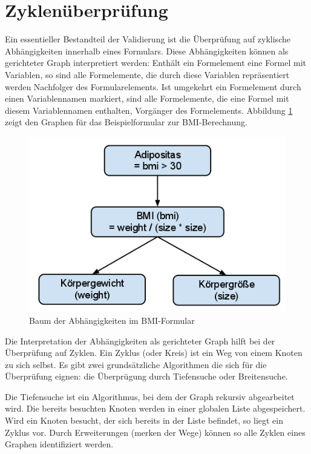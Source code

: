 \section{Zyklenüberprüfung}
\label{implementierung_zyklenueberpruefung}

Ein essentieller Bestandteil der Validierung ist die Überprüfung auf zyklische Abhängigkeiten innerhalb eines Formulars. Diese Abhängigkeiten können als gerichteter Graph interpretiert werden: Enthält ein Formelement eine Formel mit Variablen, so sind alle Formelemente, die durch diese Variablen repräsentiert werden Nachfolger des Formularelements. Ist umgekehrt ein Formelement durch einen Variablennamen markiert, sind alle Formelemente, die eine Formel mit diesem Variablennamen enthalten, Vorgänger des Formelements. Abbildung \ref{abb_cycle_bmi_tree} zeigt den Graphen für das Beispielformular zur BMI-Berechnung.

\begin{figure}[ht]
\includegraphics[scale=0.5]{figures/cycle_bmi_tree}
\caption{Baum der Abhängigkeiten im BMI-Formular}
\label{abb_cycle_bmi_tree}
\end{figure}

Die Interpretation der Abhängigkeiten als gerichteter Graph hilft bei der Überprüfung auf Zyklen. Ein Zyklus (oder Kreis) ist ein Weg von einem Knoten zu sich selbst\cite{Schl08}. Es gibt zwei grundsätzliche Algorithmen die sich für die Überprüfung eignen: die Überprügung durch Tiefensuche oder Breitensuche.

Die Tiefensuche ist ein Algorithmus, bei dem der Graph rekursiv abgearbeitet wird. Die bereits besuchten Knoten werden in einer globalen Liste abgespeichert. Wird ein Knoten besucht, der sich bereits in der Liste befindet, so liegt ein Zyklus vor. Durch Erweiterungen (merken der Wege) können so alle Zyklen eines Graphen identifiziert werden.

